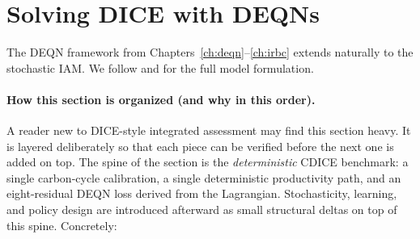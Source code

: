 \documentclass[11pt,a4paper]{report}
\begin{document}
\section{Solving DICE with DEQNs}
\label{sec:dice_deqn}

The DEQN framework from Chapters~\ref{ch:deqn}--\ref{ch:irbc} extends naturally to the stochastic IAM.  We follow \citet{friedlDeep2023} and \citet{Folini_2021} for the full model formulation.

\paragraph{How this section is organized (and why in this order).}
A reader new to DICE-style integrated assessment may find this section heavy.  It is layered deliberately so that each piece can be verified before the next one is added on top.  The spine of the section is the \emph{deterministic} CDICE benchmark: a single carbon-cycle calibration, a single deterministic productivity path, and an eight-residual DEQN loss derived from the Lagrangian.  Stochasticity, learning, and policy design are introduced afterward as small structural deltas on top of this spine.  Concretely:
\end{document}

